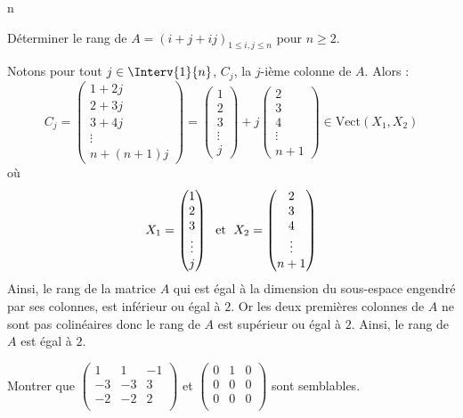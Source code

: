 n\documentclass[a4paper,10pt]{report}
\begin{document}
\begin{Exa} Déterminer le rang de $A=(i+j+ij)_{1\leq i,j\leq n}$ pour $n \geq 2$.
\end{Exa} 

\corr Notons pour tout $j \in \Interv{1}{n}$, $C_j$, la $j$-ième colonne de $A$. Alors :
$$ C_j = \begin{pmatrix}
1 + 2j \\
2 + 3j \\
3 + 4j \\
\vdots \\
n + (n+1)j
\end{pmatrix} = \begin{pmatrix}
1  \\
2  \\
3  \\
\vdots \\
 j
\end{pmatrix} + j \begin{pmatrix}
2 \\
3 \\
4\\
\vdots \\
n+1
\end{pmatrix} \in \textrm{Vect}(X_1,X_2)$$
où 
$$ X_1= \begin{pmatrix}
1  \\
2  \\
3  \\
\vdots \\
 j
\end{pmatrix} \; \hbox{ et } \; X_2 = \begin{pmatrix}
2 \\
3 \\
4\\
\vdots \\
n+1
\end{pmatrix}$$
Ainsi, le rang de la matrice $A$ qui est égal à la dimension du sous-espace engendré par ses colonnes, est inférieur ou égal à $2$. Or les deux premières colonnes de $A$ ne sont pas colinéaires donc le rang de $A$ est supérieur ou égal à $2$. Ainsi, le rang de $A$ est égal à $2$.

\begin{Exa} Montrer que $\begin{pmatrix}
1 & 1 & -1 \\
-3 & -3 & 3 \\
-2 & -2 & 2 \\
\end{pmatrix}$ et $\begin{pmatrix}
0 & 1 & 0 \\
0 & 0 & 0 \\
0 & 0 & 0 \\
\end{pmatrix}$ sont semblables.
\end{Exa}
\end{document}
